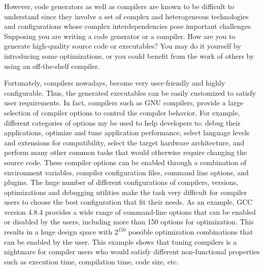 However, code generators as well as compilers are known to be difficult to understand since they involve a set of complex and heterogeneous technologies and configurations whose complex interdependencies pose important challenges. 
Supposing you are writing a code generator or a compiler. How are you to generate high-quality source code or executables? You may do it yourself by introducing some optimizations, or you could benefit from the work of others by using an off-the-shelf compiler.

Fortunately, compilers nowadays, become very user-friendly and highly configurable\cite{fursin2008milepost}. Thus, the generated executables can be easily customized to satisfy user requirements. In fact, compilers such as GNU compilers, provide a large selection of compiler options to control the compiler behavior. For example, different categories of options my be used to help developers to: debug their applications, optimize and tune application performance, select language levels and extensions for compatibility, select the target hardware architecture, and perform many other common tasks that would otherwise require changing the source code.
These compiler options can be enabled through a combination of environment variables, compiler configuration files, command line options, and plugins. 
The huge number of different configurations of compilers, versions, optimizations and debugging utilities make the task very difficult for compiler users to choose the best configuration that fit their needs. As an example, GCC version 4.8.4 provides a wide range of command-line options that can be enabled or disabled by the users, including more than 150 options for optimization. This results in a huge design space with $2^{150}$ possible optimization combinations that can be enabled by the user.
This example shows that tuning compilers is a nightmare for compiler users who would satisfy different non-functional properties such as execution time, compilation time, code size, etc.

